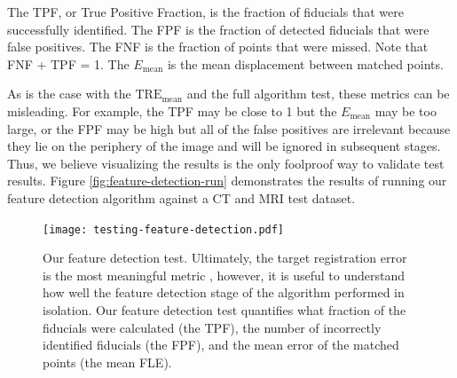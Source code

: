 \documentclass[12pt]{article}
\begin{document}
The TPF, or True Positive Fraction, is the fraction of fiducials that were successfully identified.  The FPF is the fraction of detected fiducials that were false positives.  The FNF is the fraction of points that were missed.  Note that FNF + TPF = 1.  The $E_\textrm{mean}$ is the mean displacement between matched points.

As is the case with the $\textrm{TRE}_\textrm{mean}$ and the full algorithm test, these metrics can be misleading.  For example, the TPF may be close to 1 but the $E_\textrm{mean}$ may be too large, or the FPF may be high but all of the false positives are irrelevant because they lie on the periphery of the image and will be ignored in subsequent stages.  Thus, we believe visualizing the results is the only foolproof way to validate test results.  Figure \ref{fig:feature-detection-run} demonstrates the results of running our feature detection algorithm against a CT and MRI test dataset.

\begin{figure}
    \centering
    \texttt{[image: testing-feature-detection.pdf]}
    \caption{Our feature detection test.  Ultimately, the target registration error is the most meaningful metric \cite[page R38]{hill2001}, however, it is useful to understand how well the feature detection stage of the algorithm performed in isolation.  Our feature detection test quantifies what fraction of the fiducials were calculated (the TPF), the number of incorrectly identified fiducials (the FPF), and the mean error of the matched points (the mean FLE).}
    \label{fig:testing-feature-detection}
\end{figure}
\end{document}
